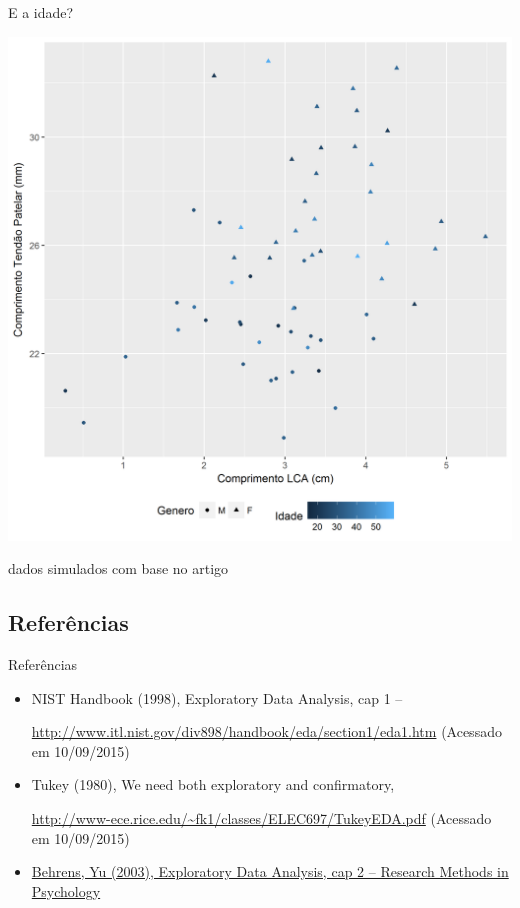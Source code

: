\documentclass{beamer}
\begin{document}
\begin{frame}{\scriptsize E a idade?}
  \begin{center}
    \includegraphics[height=.8\textheight]{EDA/EDA-corr3}
  \end{center}

  \vfill
  \tiny
  \hfill dados simulados com base no artigo
\end{frame}

\subsection{Referências}

\begin{frame}{Referências}
  \begin{itemize}
    \scriptsize
  \item NIST Handbook (1998), Exploratory Data Analysis, cap 1 --

    {\tiny \url{http://www.itl.nist.gov/div898/handbook/eda/section1/eda1.htm}}
    (Acessado em 10/09/2015)
  \item Tukey (1980), We need both exploratory and confirmatory,

    {\tiny \url{http://www-ece.rice.edu/~fk1/classes/ELEC697/TukeyEDA.pdf}}
    (Acessado em 10/09/2015)
  \item \href{https://doi.org/10.1002/0471264385.wei0202}
  {Behrens, Yu (2003), Exploratory Data Analysis, cap 2 -- Research Methods in Psychology}
  \end{itemize}
\end{frame}
\end{document}
